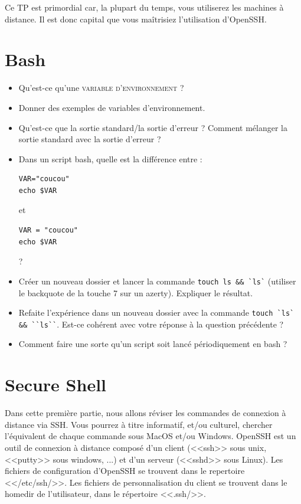 \documentclass[11pt]{article}
\newcommand{\numtd}{02}
\newcommand{\titretd}{Linux~:~Utilisation distante}
\begin{document}
\entete{\numtd}{\titretd}

\begin{introduction}
Ce TP est primordial car, la plupart du temps, vous utiliserez les machines à distance. Il est donc capital que vous maîtrisiez l'utilisation d'OpenSSH.
\end{introduction}

\section{Bash}

\begin{itemize}
\item Qu'est-ce qu'une \textsc{variable d'environnement} ?
\item Donner des exemples de variables d'environnement.
\item Qu'est-ce que la sortie standard/la sortie d'erreur ? Comment mélanger la sortie standard avec la sortie d'erreur ?
\item Dans un script bash, quelle est la différence entre :
\begin{verbatim}
VAR="coucou"
echo $VAR
\end{verbatim}
  et
\begin{verbatim}
VAR = "coucou"
echo $VAR
\end{verbatim} ?
\item Créer un nouveau dossier et lancer la commande \texttt{touch ls \&\& \`{}ls\`{}} (utiliser le backquote de la touche 7 sur un azerty). Expliquer le résultat.
\item Refaite l'expérience dans un nouveau dossier avec la commande \texttt{touch \`{}ls\`{} \&\& \`{}\`{}ls\`{}\`{}}. Est-ce cohérent avec votre réponse à la question précédente ?
\item Comment faire une sorte qu'un script soit lancé périodiquement en bash ?
\end{itemize}

\section{Secure Shell}

Dans cette première partie, nous allons réviser les commandes de connexion à distance via SSH. Vous pourrez à titre
informatif, et/ou culturel, chercher l’équivalent de chaque commande sous MacOS et/ou Windows. OpenSSH est un outil de
connexion à distance composé d’un client (<<ssh>> sous unix, <<putty>> sous windows, ...) et d’un serveur (<<sshd>> sous Linux).
Les fichiers de configuration d'OpenSSH se trouvent dans le repertoire <</etc/ssh/>>. Les fichiers de personnalisation du
client se trouvent dans le homedir de l’utilisateur, dans le répertoire <<.ssh/>>.\\
\end{document}
